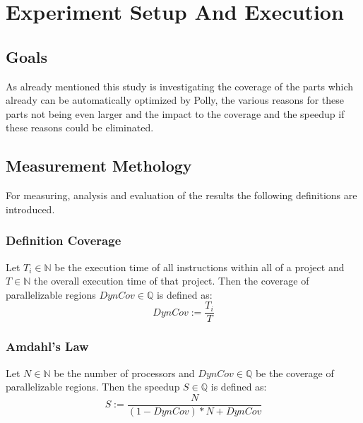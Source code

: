 \chapter{Experiment Setup And Execution}
\section{Goals}
As already mentioned this study is investigating the coverage of the parts which already can be automatically optimized by Polly, the various reasons for these parts not being even larger and the impact to the coverage and the speedup if these reasons could be eliminated.

\section{Measurement Methology}
For measuring, analysis and evaluation of the results the following definitions are introduced.
\subsection{Definition Coverage}
Let \(T_i\in\mathbb{N}\) be the execution time of all instructions within all \scops of a project and \(T\in\mathbb{N}\) the overall execution time of that project.
Then the coverage of parallelizable regions \(DynCov\in\mathbb{Q}\) is defined as:
\[DynCov := \frac{T_i}{T}\]

\subsection[Amdahl's Law]{Amdahl's Law \cite{AmdahlsLaw}}
Let \(N\in\mathbb{N}\) be the number of processors and \(DynCov\in\mathbb{Q}\) be the coverage of parallelizable regions.
Then the speedup \(S\in\mathbb{Q}\) is defined as:
\[S := \frac{N}{(1-DynCov)*N+DynCov}\]

